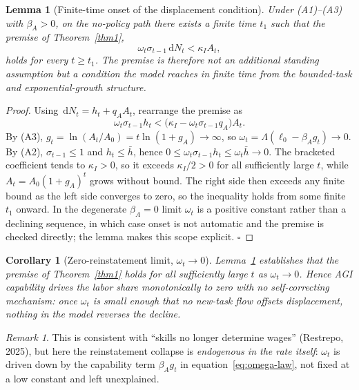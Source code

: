 \documentclass[review,12pt]{elsarticle}
\theoremstyle{plain}
\newtheorem{corollary}[theorem]{Corollary}
\newtheorem{lemma}[theorem]{Lemma}
\theoremstyle{definition}
\theoremstyle{remark}
\newtheorem{remark}[theorem]{Remark}
\newcommand{\dd}{\,\mathrm{d}}
\begin{document}
\begin{lemma}[Finite-time onset of the displacement condition]
\label{lem:onset}
Under (A1)--(A3) with $\beta_A>0$, on the no-policy path there exists a finite time $t_1$ such that the premise of Theorem~\ref{thm1},
\[
\omega_t\sigma_{t-1}\dd N_t<\kappa_I A_t,
\]
holds for every $t\ge t_1$. The premise is therefore not an additional standing assumption but a condition the model reaches in finite time from the bounded-task and exponential-growth structure.
\end{lemma}
\begin{proof}
Using $\dd N_t=h_t+q_A A_t$, rearrange the premise as
\[
\omega_t\sigma_{t-1}h_t<\bigl(\kappa_I-\omega_t\sigma_{t-1}q_A\bigr)A_t.
\]
By (A3), $g_t=\ln(A_t/A_0)=t\ln(1+g_A)\to\infty$, so $\omega_t=\Lambda(\ell_0-\beta_A g_t)\to0$. By (A2), $\sigma_{t-1}\le1$ and $h_t\le\bar h$, hence $0\le\omega_t\sigma_{t-1}h_t\le\omega_t\bar h\to0$. The bracketed coefficient tends to $\kappa_I>0$, so it exceeds $\kappa_I/2>0$ for all sufficiently large $t$, while $A_t=A_0(1+g_A)^t$ grows without bound. The right side then exceeds any finite bound as the left side converges to zero, so the inequality holds from some finite $t_1$ onward. In the degenerate $\beta_A=0$ limit $\omega_t$ is a positive constant rather than a declining sequence, in which case onset is not automatic and the premise is checked directly; the lemma makes this scope explicit. $\square$
\end{proof}

\begin{corollary}[Zero-reinstatement limit, $\omega_t\to0$]
\label{cor1}
Lemma~\ref{lem:onset} establishes that the premise of Theorem~\ref{thm1} holds for all sufficiently large $t$ as $\omega_t\to0$. Hence AGI capability drives the labor share monotonically to zero with \emph{no self-correcting mechanism}: once $\omega_t$ is small enough that no new-task flow offsets displacement, nothing in the model reverses the decline.
\end{corollary}

\begin{remark}
This is consistent with ``skills no longer determine wages'' (Restrepo, 2025), but here the reinstatement collapse is \emph{endogenous in the rate itself}: $\omega_t$ is driven down by the capability term $\beta_A g_t$ in equation~\eqref{eq:omega-law}, not fixed at a low constant and left unexplained.
\end{remark}
\end{document}

